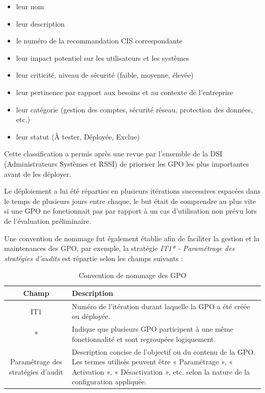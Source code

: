 \documentclass[a4paper, 11pt]{article}
\begin{document}
\begin{itemize}
  \item[$\bullet$] leur nom
  \item[$\bullet$] leur description
  \item[$\bullet$] le numéro de la recommandation CIS correspondante
  \item[$\bullet$] leur impact potentiel sur les utilisateurs et les systèmes
  \item[$\bullet$] leur criticité, niveau de sécurité (faible, moyenne, élevée)
  \item[$\bullet$] leur pertinence par rapport aux besoins et au contexte de l'entreprise
  \item[$\bullet$] leur catégorie (gestion des comptes, sécurité réseau, protection des données, etc.)
  \item[$\bullet$] leur statut (À tester, Déployée, Exclue)
\end{itemize}
\par\bigskip
Cette classification a permis après une revue par l'ensemble de la DSI (Administrateurs Systèmes et RSSI) de prioriser les GPO les plus importantes avant de les déployer.
\par\bigskip
Le déploiement a lui été réparties en plusieurs itérations successives espacées dans le temps de plusieurs jours entre chaque, le but était de comprendre au plus vite
si une GPO ne fonctionnait pas par rapport à un cas d'utilisation non prévu lors de l'évaluation préliminaire.
\par\bigskip

Une convention de nommage fut également établie afin de faciliter la gestion et la maintenances des GPO, 
par exemple, la stratégie \textit{IT1* - Paramétrage des stratégies d'audits} est répartie selon les champs suivants :\\

\begin{table}[H]
\centering
\begin{tabular}{|c|p{10cm}|}
\hline
\textbf{Champ} & \textbf{Description} \\
\hline
IT1 & Numéro de l'itération durant laquelle la GPO a été créée ou déployée. \\
\hline
* & Indique que plusieurs GPO participent à une même fonctionnalité et sont regroupées logiquement. \\
\hline
Paramétrage des stratégies d'audit & Description concise de l'objectif ou du contenu de la GPO. Les termes utilisés peuvent être « Paramétrage », « Activation », « Désactivation », etc. selon la nature de la configuration appliquée. \\
\hline
\end{tabular}
\caption{Convention de nommage des GPO}
\end{table}
\end{document}
